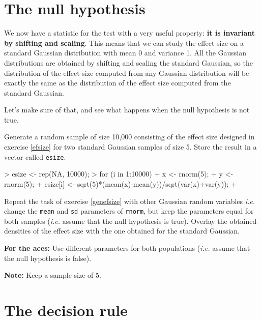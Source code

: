 \documentclass[a4paper]{article}
\theoremstyle{definition}
\begin{document}
\section{The null hypothesis}

We now have a statistic for the test with a very useful property:
\textbf{it is invariant by shifting and scaling}.
This means that we can study the effect size on a standard Gaussian
distribution with mean 0 and variance 1. All the Gaussian distributions
are obtained by shifting and scaling the standard Gaussian, so the
distribution of the effect size computed from any Gaussian distribution
will be exactly the same as the distribution of the effect size
computed from the standard Gaussian.

Let's make sure of that, and see what happens when the null hypothesis
is not true.

\begin{Exercise}
\label{genefsize}
Generate a random sample of size 10,000 consisting of the effect
size designed in exercise \ref{efsize} for two standard Gaussian
samples of size 5. Store the result in a vector called \texttt{esize}.
\end{Exercise}
\begin{Answer}
\begin{Schunk}
\begin{Sinput}
> esize <- rep(NA, 10000);
> for (i in 1:10000) {
+    x <- rnorm(5);
+    y <- rnorm(5);
+    esize[i] <- sqrt(5)*(mean(x)-mean(y))/sqrt(var(x)+var(y));
+ }
\end{Sinput}
\end{Schunk}
\end{Answer}

\begin{Exercise}
Repeat the task of exercise \ref{genefsize} with other Gaussian
random variables \textit{i.e.} change the \texttt{mean} and
\texttt{sd} parameters of \texttt{rnorm}, but keep the parameters
equal for both samples (\textit{i.e.} assume that the null
hypothesis is true). Overlay the obtained densities of the effect
size with the one obtained for the standard Gaussian.
\par\noindent\textcolor{BrickRed}{\textbf{For the aces:} Use
different parameters for both populations (\textit{i.e.} assume
that the null hypothesis is false).}
\par\noindent\textbf{Note:} Keep a sample size of 5.
\end{Exercise}

\section{The decision rule}
\end{document}
